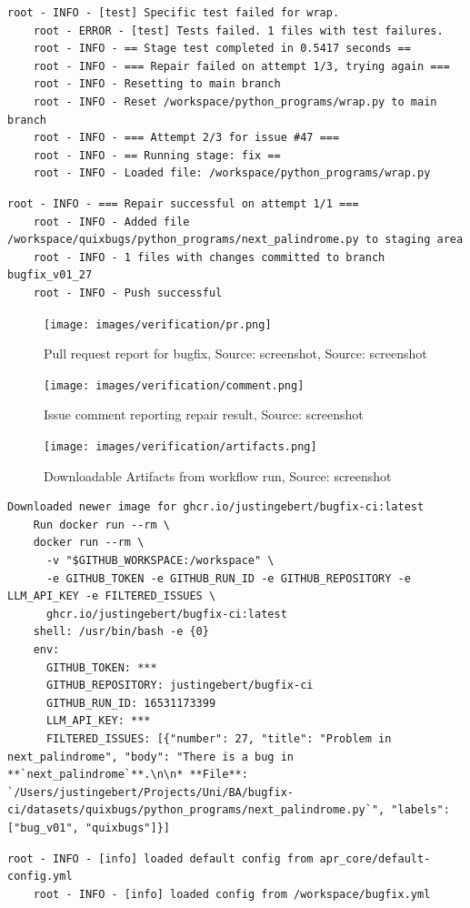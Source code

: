 \begin{lstlisting}[style=log, caption={Iterative patch generation log excerpt}, label={fig:retry}]
    root - INFO - [test] Specific test failed for wrap.
    root - ERROR - [test] Tests failed. 1 files with test failures.
    root - INFO - == Stage test completed in 0.5417 seconds ==
    root - INFO - === Repair failed on attempt 1/3, trying again ===
    root - INFO - Resetting to main branch
    root - INFO - Reset /workspace/python_programs/wrap.py to main branch
    root - INFO - === Attempt 2/3 for issue #47 ===
    root - INFO - == Running stage: fix ==
    root - INFO - Loaded file: /workspace/python_programs/wrap.py
\end{lstlisting}

\begin{lstlisting}[style=log, caption={Branch and commit created for bugfix}, label={lst:branch-commit}]
    root - INFO - === Repair successful on attempt 1/1 ===
    root - INFO - Added file /workspace/quixbugs/python_programs/next_palindrome.py to staging area
    root - INFO - 1 files with changes committed to branch bugfix_v01_27
    root - INFO - Push successful
\end{lstlisting}


\begin{figure}[H]
    \centering
    \texttt{[image: images/verification/pr.png]}
    \caption{Pull request report for bugfix, Source: screenshot, Source: screenshot}
    \label{fig:pr-report}
\end{figure}

\begin{figure}[H]
    \centering
    \texttt{[image: images/verification/comment.png]}
    \caption{Issue comment reporting repair result, Source: screenshot}
    \label{fig:comment}
\end{figure}

\begin{figure}[H]
    \centering
    \texttt{[image: images/verification/artifacts.png]}
    \caption{Downloadable Artifacts from workflow run, Source: screenshot}
    \label{fig:logs-artifacts}
\end{figure}

\begin{lstlisting}[style=log, caption={Docker container runtime log excerpt}, label={lst:docker-log}]
    Downloaded newer image for ghcr.io/justingebert/bugfix-ci:latest
    Run docker run --rm \
    docker run --rm \
      -v "$GITHUB_WORKSPACE:/workspace" \
      -e GITHUB_TOKEN -e GITHUB_RUN_ID -e GITHUB_REPOSITORY -e LLM_API_KEY -e FILTERED_ISSUES \
      ghcr.io/justingebert/bugfix-ci:latest
    shell: /usr/bin/bash -e {0}
    env:
      GITHUB_TOKEN: ***
      GITHUB_REPOSITORY: justingebert/bugfix-ci
      GITHUB_RUN_ID: 16531173399
      LLM_API_KEY: ***
      FILTERED_ISSUES: [{"number": 27, "title": "Problem in next_palindrome", "body": "There is a bug in **`next_palindrome`**.\n\n* **File**: `/Users/justingebert/Projects/Uni/BA/bugfix-ci/datasets/quixbugs/python_programs/next_palindrome.py`", "labels": ["bug_v01", "quixbugs"]}]
\end{lstlisting}

\begin{lstlisting}[style=log, caption={Load custom configuration}, label={lst:load-config}]
    root - INFO - [info] loaded default config from apr_core/default-config.yml
    root - INFO - [info] loaded config from /workspace/bugfix.yml
\end{lstlisting}